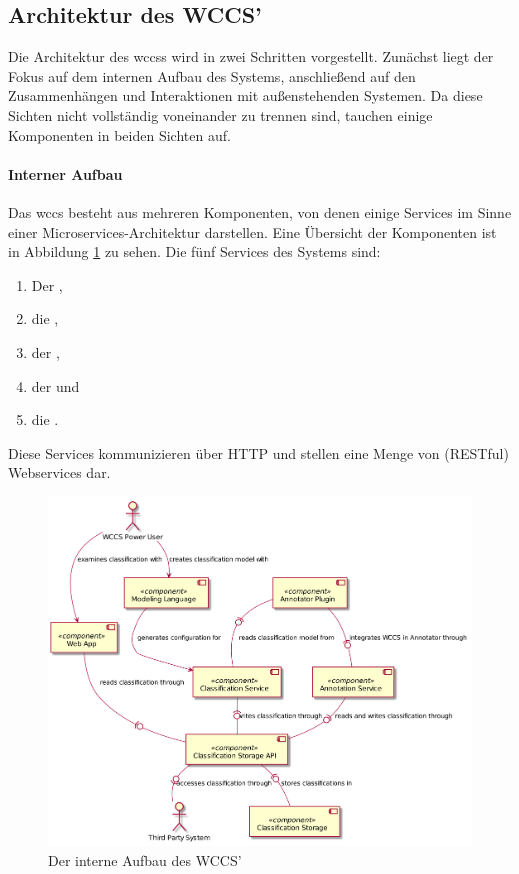     \subsection{Architektur des WCCS'}
        \label{section:solutionConceptWCCSArch}
        Die Architektur des \glspl{wccs} wird in zwei Schritten vorgestellt.
        Zunächst liegt der Fokus auf dem internen Aufbau des Systems,
        anschließend auf den Zusammenhängen und Interaktionen mit außenstehenden Systemen.
        Da diese Sichten nicht vollständig voneinander zu trennen sind,
        tauchen einige Komponenten in beiden Sichten auf.
        
        \paragraph*{Interner Aufbau}
        Das \gls{wccs} besteht aus mehreren Komponenten,
        von denen einige Services im Sinne einer Microservices-Architektur darstellen.
        Eine Übersicht der Komponenten ist in Abbildung \ref{image:wccsInternalArchitecture} zu sehen.
        Die fünf Services des Systems sind:

        \begin{enumerate}
            \item Der {\classificationStorage},
            \item die {\classificationStorageAPI},
            \item der {\classificationService},
            \item der {\annotationService} und
            \item die {\webAppService}.
        \end{enumerate}

        Diese Services kommunizieren über HTTP
        und stellen eine Menge von (RESTful) Webservices dar.

        \begin{figure}[htb]
            \centering
            \includegraphics[scale=\imageScalingFactor]{../resources/architecture/wccs_internal_architecture.png}
            \caption{Der interne Aufbau des WCCS'}
            \label{image:wccsInternalArchitecture}
        \end{figure}

